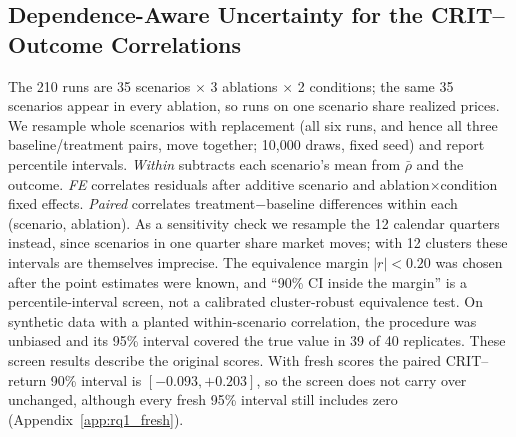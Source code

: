 \documentclass{article}
\begin{document}
\subsection{Dependence-Aware Uncertainty for the CRIT--Outcome Correlations}
\label{app:rq1_clustered}

The 210 runs are 35 scenarios $\times$ 3 ablations $\times$ 2 conditions; the same 35
scenarios appear in every ablation, so runs on one scenario share realized prices. We
resample whole scenarios with replacement (all six runs, and hence all three
baseline/treatment pairs, move together; 10{,}000 draws, fixed seed) and report
percentile intervals. \emph{Within} subtracts each scenario's mean from $\bar{\rho}$ and
the outcome. \emph{FE} correlates residuals after additive scenario and
ablation$\times$condition fixed effects. \emph{Paired} correlates treatment$-$baseline
differences within each (scenario, ablation). As a sensitivity check we resample the 12
calendar quarters instead, since scenarios in one quarter share market moves; with 12
clusters these intervals are themselves imprecise. The equivalence margin
$|r|{<}0.20$ was chosen after the point estimates were known, and ``90\% CI inside the
margin'' is a percentile-interval screen, not a calibrated cluster-robust equivalence
test. On synthetic data with a planted within-scenario correlation, the procedure was
unbiased and its 95\% interval covered the true value in 39 of 40 replicates. These screen results describe the original scores. With fresh scores the paired CRIT--return 90\% interval is $[-0.093,+0.203]$, so the screen does not carry over unchanged, although every fresh 95\% interval still includes zero (Appendix~\ref{app:rq1_fresh}).
\end{document}
